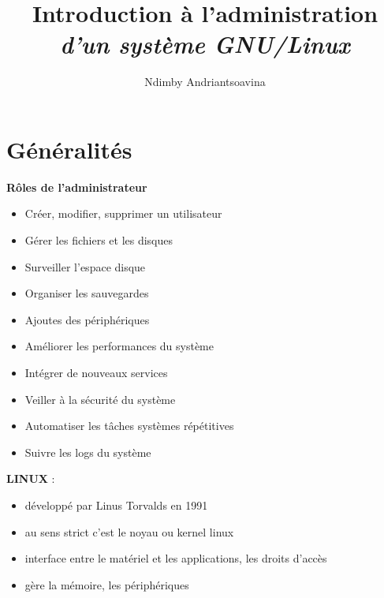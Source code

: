 \documentclass[french]{beamer}
\title{Introduction à l'administration \\ \textit{d'un système GNU/Linux}}
\author{Ndimby Andriantsoavina}
\institute{Agence universitaire de la Francophonie}
\begin{document}
\begin{frame}
\titlepage
\end{frame}

\section{Généralités}
\frame{\tableofcontents[current]}



\begin{frame}
\begin{center}
\textbf{Rôles de l'administrateur}
\end{center}
\begin{itemize}
\item Créer, modifier, supprimer un utilisateur
\item Gérer les fichiers et les disques
\item Surveiller l'espace disque
\item Organiser les sauvegardes
\item Ajoutes des périphériques
\item Améliorer les performances du système
\item Intégrer de nouveaux services
\item Veiller à la sécurité du système
\item Automatiser les tâches systèmes répétitives
\item Suivre les logs du système
\end{itemize}
\end{frame}

\begin{frame}
\textbf{LINUX} :
    \begin{itemize}
    \item développé par Linus Torvalds en 1991
    \item au sens strict c'est le noyau ou kernel linux
    \item interface entre le matériel et les applications, les droits d'accès
    \item gère la mémoire, les périphériques 
    \end{itemize}
\end{frame}
\end{document}
